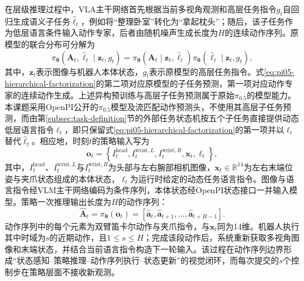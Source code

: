 在层级推理过程中，VLA主干网络首先根据当前多视角观测和高层任务指令\(g_t\)自回归生成语义子任务\(\widehat{\ell}_t\)，例如将“整理卧室”转化为“拿起枕头”；随后，该子任务作为低层语言条件输入动作专家，后者由随机噪声生成长度为\(H\)的连续动作序列。原模型的联合分布可分解为
\begin{equation}
  \pi_{\boldsymbol\theta}
  \left(\mathbf A_t,\widehat{\ell}_t\mid\mathbf z_t,g_t\right)
  =
  \pi_{\boldsymbol\theta}
  \left(\mathbf A_t\mid\mathbf z_t,\widehat{\ell}_t\right)
  \pi_{\boldsymbol\theta}
  \left(\widehat{\ell}_t\mid\mathbf z_t,g_t\right),
  \label{eq:pi05-hierarchical-factorization}
\end{equation}
其中，\(\mathbf z_t\)表示图像与机器人本体状态，\(g_t\)表示原模型的高层任务指令。式\eqref{eq:pi05-hierarchical-factorization}的第二项对应原模型的子任务预测，第一项对应动作专家的连续动作生成。上述异构预训练与高层子任务预测属于原始\(\pi_{0.5}\)的模型能力。本课题采用OpenPI公开的\(\pi_{0.5}\)模型及流匹配动作预测头，不使用其高层子任务预测，而由第\ref{subsec:task-definition}节的外部任务状态机按五个子任务直接提供动态低层语言指令\(\ell_t\)，即只保留式\eqref{eq:pi05-hierarchical-factorization}的第一项并以\(\ell_t\)替代\(\widehat{\ell}_t\)。相应地，时刻\(t\)的策略输入写为
\begin{equation}
  \mathbf o_t
  =
  \left\{
    I^{\mathrm{head}}_t,
    I^{\mathrm{wrist},L}_t,
    I^{\mathrm{wrist},R}_t,
    \mathbf x_t,
    \ell_t
  \right\},
  \label{eq:openpi-observation}
\end{equation}
其中，\(I^{\mathrm{head}}_t\)、\(I^{\mathrm{wrist},L}_t\)与\(I^{\mathrm{wrist},R}_t\)为头部与左右腕部相机图像，\(\mathbf x_t\in\mathbb R^{14}\)为左右末端位姿与夹爪状态组成的本体状态，\(\ell_t\)为运行时给定的动态任务语言指令。图像与语言指令经VLM主干网络编码为条件序列，本体状态经OpenPI状态接口一并输入模型。策略一次推理输出长度为\(H\)的动作序列：
\begin{equation}
  \widehat{\mathbf A}_t
  =
  \pi_{\boldsymbol\theta}(\mathbf o_t)
  =
  \left[
    \widehat{\mathbf a}_{t},
    \widehat{\mathbf a}_{t+1},
    \ldots,
    \widehat{\mathbf a}_{t+H-1}
  \right].
  \label{eq:openpi-action-chunk}
\end{equation}
动作序列中的每个元素为双臂笛卡尔动作与夹爪指令，与\(\mathbf x_t\)同为14维。机器人执行其中时域为\(s\)的近期动作，且\(1\leq s\leq H\)；完成该段动作后，系统重新获取多视角图像和末端状态，并结合当前语言指令构造下一轮输入。该过程在动作序列边界形成“状态感知--策略推理--动作序列执行--状态更新”的视觉闭环，而每次提交的\(s\)个控制步在策略层面不接收新观测。

